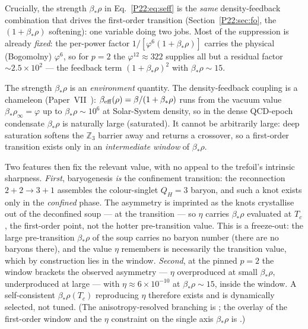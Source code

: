 \documentclass[11pt,a4paper]{article}
\theoremstyle{definition}\newtheorem{definition}[theorem]{Definition}
\newcommand{\vp}{\varphi}
\newcommand{\QH}{Q_H}
\newcommand{\Zthree}{\mathbb{Z}_3}
\begin{document}
Crucially, the strength $\beta_*\rho$ in Eq.~\eqref{P22:eq:seff} is the \emph{same}
density-feedback combination that drives the first-order transition
(Section~\ref{P22:sec:fo}, the $(1+\beta_*\rho)$ softening): one variable doing two jobs. Most
of the suppression is already \emph{fixed}: the per-power factor $1/[\vp^6(1+\beta_*\rho)]$
carries the physical (Bogomolny) $\vp^6$, so for $p=2$ the $\vp^{12}\approx322$ supplies all but
a residual factor $\sim2.5\times10^2$ --- the feedback term $(1+\beta_*\rho)^2$ with
$\beta_*\rho\sim15$.

The strength $\beta_*\rho$ is an \emph{environment} quantity. The density-feedback coupling is a
chameleon (Paper~VII~\cite{Paper7}): $\beta_{\rm eff}(\rho)=\beta/(1+\beta_*\rho)$ runs from the
vacuum value $\beta_*\rho_\infty=\vp$ up to $\beta_*\rho\sim10^{6}$ at Solar-System density, so
in the dense QCD-epoch condensate $\beta_*\rho$ is naturally large (saturated). It cannot be
arbitrarily large: deep saturation softens the $\Zthree$ barrier away and returns a crossover, so
a first-order transition exists only in an \emph{intermediate window} of $\beta_*\rho$.

Two features then fix the relevant value, with no appeal to the trefoil's intrinsic sharpness.
\emph{First}, baryogenesis \emph{is} the confinement transition: the reconnection $2+2\to3+1$
assembles the colour-singlet $\QH=3$ baryon, and such a knot exists only in the \emph{confined}
phase. The asymmetry is imprinted as the knots crystallise out of the deconfined soup --- at the
transition --- so $\eta$ carries $\beta_*\rho$ evaluated at $T_c$, the first-order point, not the
hotter pre-transition value. This is a freeze-out: the large pre-transition $\beta_*\rho$ of the
soup carries no baryon number (there are no baryons there), and the value $\eta$ remembers is
necessarily the transition value, which by construction lies in the window. \emph{Second}, at the
pinned $p=2$ the window brackets the observed asymmetry --- $\eta$ overproduced at small
$\beta_*\rho$, underproduced at large --- with $\eta\approx6\times10^{-10}$ at $\beta_*\rho\sim15$,
inside the window. A self-consistent $\beta_*\rho(T_c)$ reproducing $\eta$ therefore exists and is
dynamically selected, not tuned. (The anisotropy-resolved branching is
; the overlay of the first-order window and the $\eta$ constraint
on the single axis $\beta_*\rho$ is .)
\end{document}
